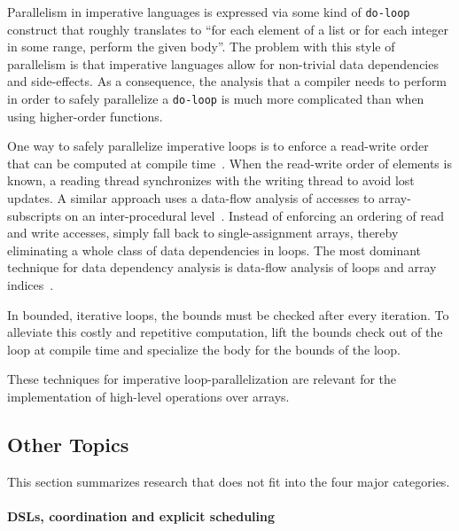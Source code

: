 \documentclass[a4paper]{article}
\begin{document}
Parallelism in imperative languages is expressed via some kind of
\texttt{do-loop} construct that roughly translates to ``for each
element of a list or for each integer in some range, perform the given
body''. The problem with this style of parallelism is that imperative
languages allow for non-trivial data dependencies and side-effects. As
a consequence, the analysis that a compiler needs to perform in order
to safely parallelize a \texttt{do-loop} is much more complicated than
when using higher-order functions.

One way to safely parallelize imperative loops is to enforce a
read-write order that can be computed at compile
time~\cite{Tang:1990:CTD:77726.255155}. When the read-write order of
elements is known, a reading thread synchronizes with the writing
thread to avoid lost updates. A similar approach uses a data-flow
analysis of accesses to array-subscripts on an inter-procedural
level~\cite{Maydan:1993:AFA:158511.158515}. Instead of enforcing an
ordering of read and write accesses,
\citet{Knobe:1998:ASF:268946.268956} simply fall back to
single-assignment arrays, thereby eliminating a whole class of data
dependencies in loops. The most dominant technique for data dependency
analysis is data-flow analysis of loops and array
indices~\cite{Maydan:1993:AFA:158511.158515,
  Knobe:1998:ASF:268946.268956}.

In bounded, iterative loops, the bounds must be checked after every
iteration. To alleviate this costly and repetitive computation,
\citet{Henriksen:2014:BCI:2627373.2627388} lift the bounds check out
of the loop at compile time and specialize the body for the bounds of
the loop.

These techniques for imperative loop-parallelization are relevant for
the implementation of high-level operations over arrays.

\subsection{Other Topics}
\label{sec:other-topics}

This section summarizes research that does not fit into the four major
categories.

\paragraph{DSLs, coordination and explicit scheduling}

\cite{4228136, Ureche:2012:SCS:2103746.2103762}
\end{document}
